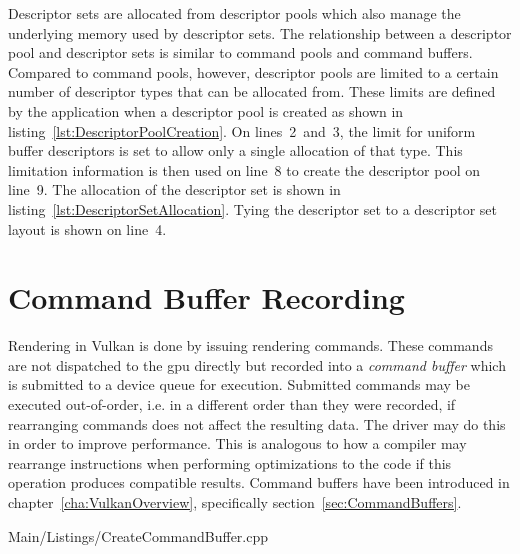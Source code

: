       Descriptor sets are allocated from descriptor pools which also manage the underlying memory used by descriptor sets.
      The relationship between a descriptor pool and descriptor sets is similar to command pools and command buffers.
      Compared to command pools, however, descriptor pools are limited to a certain number of descriptor types that can be allocated from.
      These limits are defined by the application when a descriptor pool is created as shown in listing~\ref{lst:DescriptorPoolCreation}.
      On lines~2~and~3, the limit for uniform buffer descriptors is set to allow only a single allocation of that type.
      This limitation information is then used on line~8 to create the descriptor pool on line~9.
      The allocation of the descriptor set is shown in listing~\ref{lst:DescriptorSetAllocation}.
      Tying the descriptor set to a descriptor set layout is shown on line~4.



  \section{Command Buffer Recording}
  \label{sec:BuildCommandBuffers}
    Rendering in Vulkan is done by issuing rendering commands.
    These commands are not dispatched to the \gls{gpu} directly but recorded into a \textit{command buffer} which is submitted to a device queue for execution.
    Submitted commands may be executed out-of-order, i.e. in a different order than they were recorded, if rearranging commands does not affect the resulting data.
    The \gls{driver} may do this in order to improve performance.
    This is analogous to how a compiler may rearrange instructions when performing optimizations to the code if this operation produces compatible results.
    Command buffers have been introduced in chapter~\ref{cha:VulkanOverview}, specifically section~\ref{sec:CommandBuffers}.

    
    {Main/Listings/CreateCommandBuffer.cpp}

